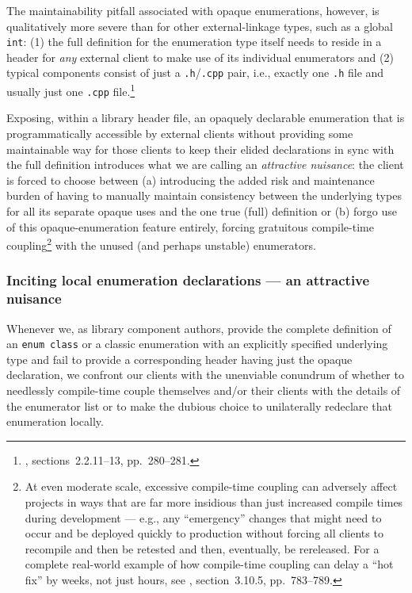 The maintainability pitfall associated with opaque enumerations,
however, is qualitatively more severe than for other external-linkage
types, such as a global \lstinline!int!: (1) the full definition for the
enumeration type itself needs to reside in a header for \emph{any}
external client to make use of its individual enumerators and (2)
typical components consist of just a \lstinline!.h!/\lstinline!.cpp! pair,
i.e., exactly one \lstinline!.h! file and usually just one \lstinline!.cpp!
file.{\cprotect\footnote{\cite{lakos20}, sections~2.2.11--13,
pp.~280--281.}}

Exposing, within a library header file, an opaquely declarable
enumeration that is programmatically accessible by external clients
without providing some maintainable way for those clients to keep their
elided declarations in sync with the full definition introduces what we
are calling an \emph{attractive nuisance}: the client is forced to
choose between (a) introducing the added risk and maintenance burden of
having to manually maintain consistency between the underlying types for
all its separate opaque uses and the one true (full) definition or (b)
forgo use of this opaque-enumeration feature entirely, forcing
gratuitous compile-time coupling\footnote{At even moderate scale, excessive
compile-time coupling can adversely affect projects in ways that are far
more insidious than just increased compile times during development ---
e.g., any ``emergency'' changes that might need to occur and be deployed
quickly to production without forcing all clients to recompile and then
be retested and then, eventually, be rereleased. For a complete
real-world example of how compile-time coupling can delay a ``hot fix''
by weeks, not just hours, see \cite{lakos20}, section~3.10.5,
pp.~783--789.} with
the unused (and perhaps unstable) enumerators.

\subsubsection[Inciting local enumeration declarations — an attractive nuisance]{Inciting local enumeration declarations — an attractive nuisance}\label{inciting-local-enumeration-declarations-—-an-attractive-nuisance}

Whenever we, as library component authors, provide the complete
definition of an \lstinline!enum!~\lstinline!class! or a classic enumeration
with an explicitly specified underlying type and fail to provide a
corresponding header having just the opaque declaration, we confront our
clients with the unenviable conundrum of whether to needlessly
compile-time couple themselves and/or their clients with the details of
the enumerator list or to make the dubious choice to unilaterally
redeclare that enumeration locally.

